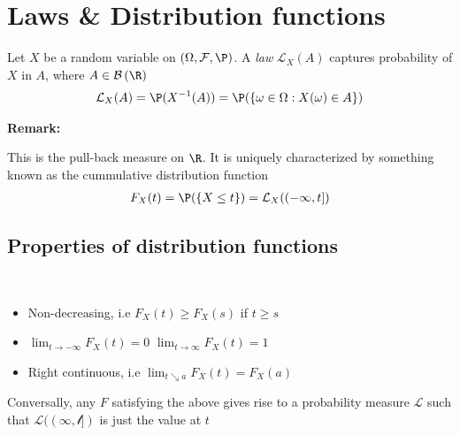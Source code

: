\section{Laws \& Distribution functions}
\par\bigskip
\begin{defo}[Law]{}
  Let $X$ be a random variable on $(\Omega, \mathcal{F},\P)$. A \textit{law} $\mathcal{L}_X(A)$ captures probability of $X$ in $A$, where $A\in\mathcal{B}\left(\R\right)$
  \begin{equation*}
    \begin{gathered}
    \mathcal{L}_X(A) = \P(X^{-1}(A)) = \P(\left\{\omega\in\Omega:X(\omega)\in A\right\})
    \end{gathered}
  \end{equation*}
\end{defo}
\par\bigskip
\noindent\textbf{Remark:}\par
\noindent This is the pull-back measure on $\R$. It is uniquely characterized by something known as the cummulative distribution function
\begin{equation*}
  \begin{gathered}
    F_X(t) = \P(\left\{X\leq t\right\}) = \mathcal{L}_X((-\infty,t])
  \end{gathered}
\end{equation*}
\par\bigskip
\subsection{Properties of distribution functions}\hfill\\
\begin{itemize}
  \item Non-decreasing, i.e $F_X(t)\geq F_X(s)$ if $t\geq s$
  \item $\lim_{t\to-\infty}F_X(t) = 0$ $\lim_{t\to\infty}F_X(t) = 1$
  \item Right continuous, i.e $\lim_{t\searrow a}F_X(t) = F_X(a)$
\end{itemize}\par
\noindent Conversally, any $F$ satisfying the above gives rise to a probability measure $\mathcal{L}$ such that $\mathcal{L((\infty,t])}$ is just the value at $t$
\par\bigskip
